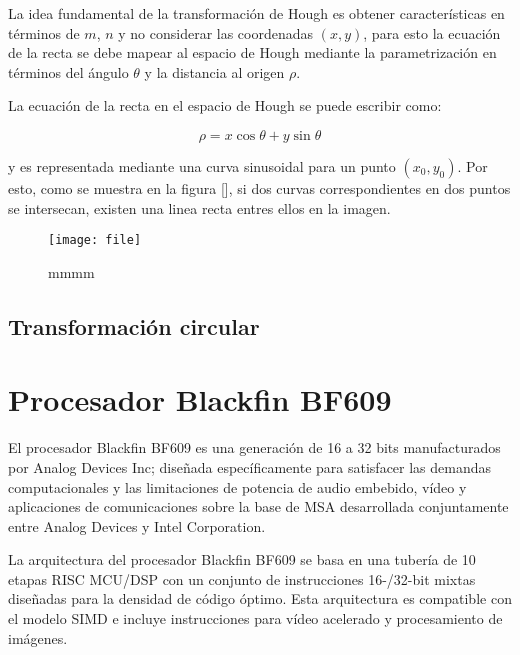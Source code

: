 La idea fundamental de la transformación de Hough es obtener características en términos de $m$, $n$ y no considerar las coordenadas $(x,y)$, para esto la ecuación de la recta se debe mapear al espacio de Hough mediante la parametrización en términos del ángulo $\theta$ y la distancia al origen $\rho$.%




%


La ecuación de la recta en el espacio de Hough se puede escribir como:

\begin{equation}
\rho = x\cos\theta + y\sin\theta
\end{equation}

y es representada mediante una curva sinusoidal para un punto $(x_{0},y_{0})$. Por esto, como se muestra en la figura [], si dos curvas correspondientes en dos puntos se intersecan, existen una linea recta entres ellos en la imagen.

\begin{figure}[hbtp]
\texttt{[image: file]}
\caption{mmmm}
\end{figure}

  
\subsection{Transformación circular}



\section{Procesador Blackfin BF609}

El procesador Blackfin BF609 es una generación de 16 a 32 bits manufacturados por Analog Devices Inc; diseñada específicamente para satisfacer las demandas computacionales y las limitaciones de potencia de audio embebido, vídeo y aplicaciones de comunicaciones sobre la base de MSA desarrollada conjuntamente entre Analog Devices y Intel Corporation\cite{GanKuo2007}. 

La arquitectura del procesador Blackfin BF609 se basa en una tubería de 10 etapas RISC MCU/DSP con un conjunto de instrucciones 16-/32-bit mixtas diseñadas para la densidad de código óptimo. Esta arquitectura es compatible con el modelo SIMD\cite{Lawson1992} e incluye instrucciones para vídeo acelerado y procesamiento de imágenes.  

